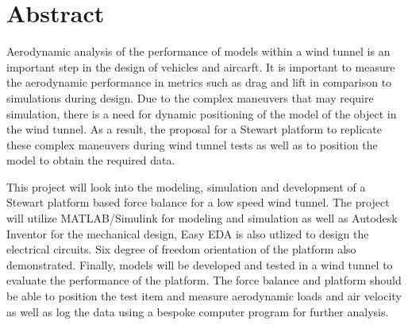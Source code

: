
\section*{Abstract}
\label{sec:Abstract}
Aerodynamic analysis of the performance of models within a wind tunnel is an important step in the design of vehicles and aircarft. It is important to measure the aerodynamic performance in metrics such as drag and lift in comparison to simulations during design.
Due to the complex maneuvers that may require simulation, there is a need for dynamic positioning of the model of the object in the wind tunnel. As a result, the proposal for a Stewart platform to replicate these complex maneuvers during wind tunnel tests as well as to position the model to obtain the required data.

This project will look into the modeling, simulation and development of a Stewart
platform based force balance for a low speed wind tunnel. The project will utilize
MATLAB/Simulink for modeling and simulation as well as Autodesk Inventor for the mechanical
design, Easy EDA is also utlized to design the electrical circuits. Six degree of freedom orientation of the platform also demonstrated. 
Finally, models will be developed and tested in a wind tunnel to evaluate the performance
of the platform. The force balance and platform should be able to position the test
item and measure aerodynamic loads and air velocity as well as log the data using a bespoke computer program for further analysis.





